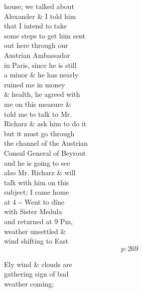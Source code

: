 \documentclass{report}
\begin{document}


	\par{
 	house; we talked about\ \\Alexander \& I told him\ \\that I intend to take\ \\some steps to get him sent\ \\out here through our\ \\Austrian Ambassador\ \\in Paris, since he is still\ \\a minor \& he has nearly\ \\ruined me in money\ \\\& health, he agreed with\ \\me on this measure \&\ \\told me to talk to Mr.\ \\Richarz \& ask him to do it\ \\but it must go through\ \\the channel of the Austrian\ \\Consul General of Beyrout\ \\and he is going to see\ \\also Mr. Richarz \& will\ \\talk with him on this\ \\subject; I came home\ \\at 4 \~{} Went to dîne\ \\with Sister Medula\ \\and returned at 9 Pm,\ \\weather unsettled \&\ \\wind shifting to East\ \\
  \[p: 269 \]

	}





	\par{
 	Ely wind \& clouds are\ \\gathering sign of bad\ \\weather coming;\ \\
	}
\end{document}
